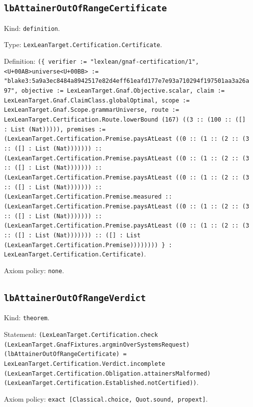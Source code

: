 \documentclass[11pt]{article}
\begin{document}
\subsection*{\texttt{lbAttainerOutOfRangeCertificate}}
\noindent Kind: \texttt{definition}.\par
\noindent Type: \texttt{LexLeanTarget.Certification.Certificate}.\par
\noindent Definition: \texttt{(\{ verifier := "lexlean/gnaf-certification/1", <U+00AB>universe<U+00BB> := "blake3:5a9a3ec8484a8942517e82d4eff61eafd177e7e93a710294f197501aa3a26a97", objective := LexLeanTarget.Gnaf.Objective.scalar, claim := LexLeanTarget.Gnaf.ClaimClass.globalOptimal, scope := LexLeanTarget.Gnaf.Scope.grammarUniverse, route := LexLeanTarget.Certification.Route.lowerBound (167) ((3 :: (100 :: ([] : List (Nat))))), premises := (LexLeanTarget.Certification.Premise.paysAtLeast ((0 :: (1 :: (2 :: (3 :: ([] : List (Nat))))))) :: (LexLeanTarget.Certification.Premise.paysAtLeast ((0 :: (1 :: (2 :: (3 :: ([] : List (Nat))))))) :: (LexLeanTarget.Certification.Premise.paysAtLeast ((0 :: (1 :: (2 :: (3 :: ([] : List (Nat))))))) :: (LexLeanTarget.Certification.Premise.measured :: (LexLeanTarget.Certification.Premise.paysAtLeast ((0 :: (1 :: (2 :: (3 :: ([] : List (Nat))))))) :: (LexLeanTarget.Certification.Premise.paysAtLeast ((0 :: (1 :: (2 :: (3 :: ([] : List (Nat))))))) :: ([] : List (LexLeanTarget.Certification.Premise)))))))) \} : LexLeanTarget.Certification.Certificate)}.\par
\noindent Axiom policy: \texttt{none}.\par
\subsection*{\texttt{lbAttainerOutOfRangeVerdict}}
\noindent Kind: \texttt{theorem}.\par
\noindent Statement: \texttt{(LexLeanTarget.Certification.check (LexLeanTarget.GnafFixtures.argminOverSystemsRequest) (lbAttainerOutOfRangeCertificate) = LexLeanTarget.Certification.Verdict.incomplete (LexLeanTarget.Certification.Obligation.attainersMalformed) (LexLeanTarget.Certification.Established.notCertified))}.\par
\noindent Axiom policy: \texttt{exact [Classical.choice, Quot.sound, propext]}.\par
\end{document}
